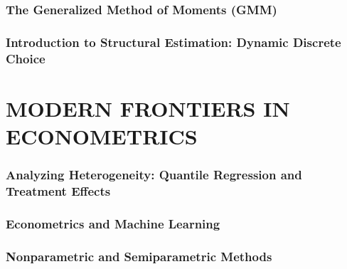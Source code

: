 \documentclass{article}
\begin{document}
\section{The Generalized Method of Moments (GMM)}


\section{Introduction to Structural Estimation: Dynamic Discrete Choice}



\newpage
\part{MODERN FRONTIERS IN ECONOMETRICS}

\section{Analyzing Heterogeneity: Quantile Regression and Treatment Effects}


\section{Econometrics and Machine Learning} %
\label{sec:econometrics_and_machine_learning}



\section{Nonparametric and Semiparametric Methods} %
\label{sec:nonparametric_and_semiparametric_methods}
\end{document}
